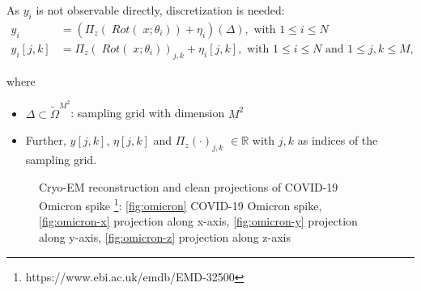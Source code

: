


As $y_i$ is not observable directly, discretization is needed:
\begin{equation}
    \label{eq:cryoEmSimpleDiscrete}
    \begin{aligned}
        y_i &= \left( \Pi_z (\; Rot (\;x; \theta_i)) + \eta_i\right)(\Delta), \text{ with } 1 \leq i \leq N \\
        y_i[j,k] &= \Pi_z (\; Rot(\;x; \theta_i))_{j,k} + \eta_i[j,k], \text{ with } 1 \leq i \leq N \text{ and } 1 \leq j,k \leq M,
    \end{aligned}
\end{equation}

where 
\begin{itemize}
    \item $\Delta \subset \tilde{\Omega}^{M^2}$: sampling grid with dimension $M^2$
    \item Further, $y[j,k]$, $\eta[j,k]$ and $\Pi_z(\cdot)_{j,k}$ $ \in \mathbb{R}$ with $j,k$ as indices of the sampling grid.
\end{itemize}


\begin{figure}[H]
    \label{fig:cryo-em-omicron}
    \hfill
    \hfill
    \hfill
    \hfill
    \hfill
	\caption{Cryo-EM reconstruction and clean projections of COVID-19 Omicron spike \protect\footnote{https://www.ebi.ac.uk/emdb/EMD-32500}: 
    \ref{fig:omicron} COVID-19 Omicron spike,
    \ref{fig:omicron-x} projection along x-axis,
    \ref{fig:omicron-y} projection along y-axis,
    \ref{fig:omicron-z} projection along z-axis
    }
\end{figure}



